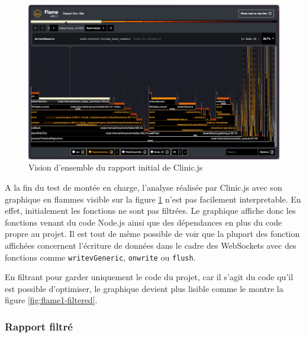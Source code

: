 \begin{figure}[H]
  \centering
  \includegraphics[width=1\textwidth]{./assets/figures/flame/flame1-overview.png}
  \caption{Vision d'ensemble du rapport initial de Clinic.js}
  \label{fig:flame1-overview}
\end{figure}

A la fin du test de montée en charge, l'analyse réalisée par Clinic.js avec son graphique en flammes visible sur la figure \ref{fig:flame1-overview} n'est pas facilement interpretable. En effet, initialement les fonctions ne sont pas filtrées. Le graphique affiche donc les fonctions venant du code Node.js ainsi que des dépendances en plus du code propre au projet. Il est tout de même possible de voir que la plupart des fonction affichées concernent l'écriture de données dans le cadre des WebSockets avec des fonctions comme \texttt{writevGeneric}, \texttt{onwrite} ou \texttt{flush}.

En filtrant pour garder uniquement le code du projet, car il s'agit du code qu'il est possible d'optimiser, le graphique devient plus lisible comme le montre la figure \ref{fig:flame1-filtered}.

\subsubsection{Rapport filtré}

